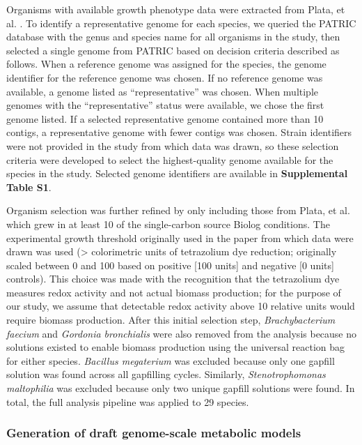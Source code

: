 \documentclass[11pt,onecolumn,notitlepage,openany,twoside]{book}
\begin{document}
\begin{refsection}
Organisms with available growth phenotype data were extracted from Plata, et al. \cite{Plata2015-bc}. To identify a representative genome for each species, we queried the PATRIC database \cite{Wattam2017-tk} with the genus and species name for all organisms in the study, then selected a single genome from PATRIC based on decision criteria described as follows. When a reference genome was assigned for the species, the genome identifier for the reference genome was chosen. If no reference genome was available, a genome listed as “representative” was chosen. When multiple genomes with the “representative” status were available, we chose the first genome listed. If a selected representative genome contained more than 10 contigs, a representative genome with fewer contigs was chosen. Strain identifiers were not provided in the study from which data was drawn, so these selection criteria were developed to select the highest-quality genome available for the species in the study. Selected genome identifiers are available in \textbf{Supplemental Table S1}.

Organism selection was further refined by only including those from Plata, et al. which grew in at least 10 of the single-carbon source Biolog conditions. The experimental growth threshold originally used in the paper from which data were drawn was used (\textgreater{} colorimetric units of tetrazolium dye reduction; originally scaled between 0 and 100 based on positive [100 units] and negative [0 units] controls). This choice was made with the recognition that the tetrazolium dye measures redox activity and not actual biomass production; for the purpose of our study, we assume that detectable redox activity above 10 relative units would require biomass production. After this initial selection step, \textit{Brachybacterium faecium} and \textit{Gordonia bronchialis} were also removed from the analysis because no solutions existed to enable biomass production using the universal reaction bag for either species. \textit{Bacillus megaterium} was excluded because only one gapfill solution was found across all gapfilling cycles. Similarly, \textit{Stenotrophomonas maltophilia} was excluded because only two unique gapfill solutions were found. In total, the full analysis pipeline was applied to 29 species.

\subsubsection{Generation of draft genome-scale metabolic models}


\end{refsection}
\end{document}
